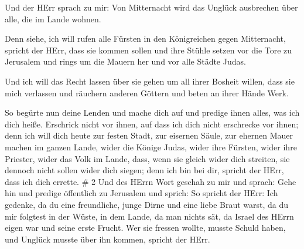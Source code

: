  Und der HErr sprach zu mir: Von Mitternacht wird das
Unglück ausbrechen über alle, die im Lande wohnen.

 Denn siehe, ich will rufen alle Fürsten in den
Königreichen gegen Mitternacht, spricht der HErr, dass sie kommen sollen
und ihre Stühle setzen vor die Tore zu Jerusalem und rings um die Mauern
her und vor alle Städte Judas.

 Und ich will das Recht lassen über sie gehen um all ihrer
Bosheit willen, dass sie mich verlassen und räuchern anderen Göttern und
beten an ihrer Hände Werk.

 So begürte nun deine Lenden und mache dich auf und predige
ihnen alles, was ich dich heiße. Erschrick nicht vor ihnen, auf dass ich
dich nicht erschrecke vor ihnen;  denn ich will dich heute
zur festen Stadt, zur eisernen Säule, zur ehernen Mauer machen im ganzen
Lande, wider die Könige Judas, wider ihre Fürsten, wider ihre Priester,
wider das Volk im Lande,  dass, wenn sie gleich wider dich
streiten, sie dennoch nicht sollen wider dich siegen; denn ich bin bei
dir, spricht der HErr, dass ich dich errette. \# 2  Und des
HErrn Wort geschah zu mir und sprach:  Gehe hin und predige
öffentlich zu Jerusalem und sprich: So spricht der HErr: Ich gedenke, da
du eine freundliche, junge Dirne und eine liebe Braut warst, da du mir
folgtest in der Wüste, in dem Lande, da man nichts sät,  da
Israel des HErrn eigen war und seine erste Frucht. Wer sie fressen
wollte, musste Schuld haben, und Unglück musste über ihn kommen, spricht
der HErr.

